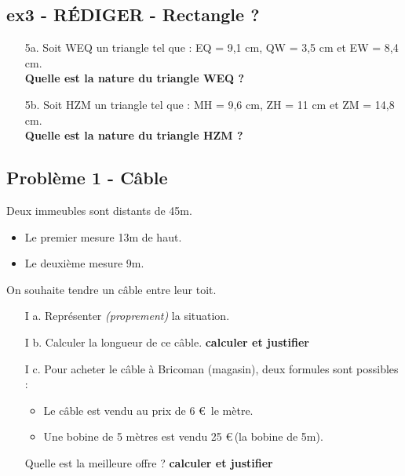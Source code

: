 \documentclass[12pt]{article}
\begin{document}
\subsection*{ex3 - \textbf{RÉDIGER} - Rectangle ?}

\begin{enumerate}
  \item[5a.]Soit WEQ un triangle tel que : EQ = 9,1 cm, QW = 3,5 cm et EW = 8,4 cm.\\
  \textbf{Quelle est la nature du triangle WEQ ?} \\ \Pointilles[4]

  \item[5b.]Soit HZM un triangle tel que : MH = 9,6 cm, ZH = 11 cm et ZM = 14,8 cm. \\
  \textbf{Quelle est la nature du triangle HZM ?} \\ \Pointilles[4]
\end{enumerate}


\newpage

\subsection*{Problème 1 - Câble}

Deux immeubles sont distants de 45m. 
  \begin{itemize}
  \item Le premier mesure 13m de haut.
  \item Le deuxième mesure 9m. 
  \end{itemize}

On souhaite tendre un câble entre leur toit. 

\begin{enumerate}
  \item[I a.] Représenter \textit{(proprement)} la situation.

  \item[I b.] Calculer la longueur de ce câble. \textbf{calculer et justifier}

  \item[I c.] Pour acheter le câble à Bricoman (magasin), deux formules sont possibles :  
  \begin{itemize}
  \item Le câble est vendu  au prix de 6 \euro \, le mètre. 
  \item Une bobine de 5 mètres est vendu 25 \euro \,(la bobine de 5m). 
  \end{itemize} 
  Quelle est la meilleure offre ? \textbf{calculer et justifier}
\end{enumerate}
\end{document}
